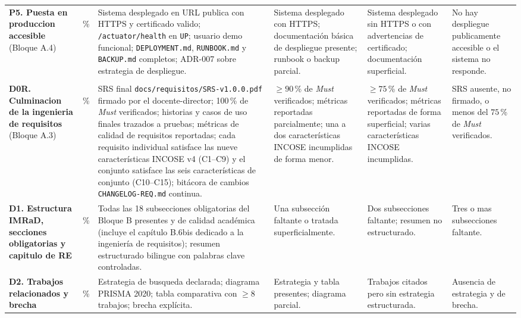 \documentclass[11pt,a4paper]{article}
\begin{document}
{\begin{longtable}{|L{2.9cm}|C{0.9cm}|L{2.5cm}|L{2.5cm}|L{2.5cm}|L{2.3cm}|}
\textbf{P5. Puesta en produccion accesible} (Bloque A.4) &
\,\% &
Sistema desplegado en URL publica con HTTPS y certificado valido; \texttt{/actuator/health} en \texttt{UP}; usuario demo funcional; \texttt{DEPLOYMENT.md}, \texttt{RUNBOOK.md} y \texttt{BACKUP.md} completos; ADR-007 sobre estrategia de despliegue. &
Sistema desplegado con HTTPS; documentaci\'{o}n b\'{a}sica de despliegue presente; runbook o backup parcial. &
Sistema desplegado sin HTTPS o con advertencias de certificado; documentaci\'{o}n superficial. &
No hay despliegue publicamente accesible o el sistema no responde. \\

\\ \hline

\textbf{D0R. Culminacion de la ingenieria de requisitos} (Bloque A.3) &
\,\% &
SRS final \texttt{docs/requisitos/SRS-v1.0.0.pdf} firmado por el docente-director; 100\,\% de \emph{Must} verificados; historias y casos de uso finales trazados a pruebas; m\'{e}tricas de calidad de requisitos reportadas; cada requisito individual satisface las nueve caracter\'{i}sticas INCOSE v4 (C1--C9) y el conjunto satisface las seis caracter\'{i}sticas de conjunto (C10--C15); bit\'{a}cora de cambios \texttt{CHANGELOG-REQ.md} continua. &
$\geq 90$\,\% de \emph{Must} verificados; m\'{e}tricas reportadas parcialmente; una a dos caracter\'{i}sticas INCOSE incumplidas de forma menor. &
$\geq 75$\,\% de \emph{Must} verificados; m\'{e}tricas reportadas de forma superficial; varias caracter\'{i}sticas INCOSE incumplidas. &
SRS ausente, no firmado, o menos del $75$\,\% de \emph{Must} verificados. \\

\textbf{D1. Estructura IMRaD, secciones obligatorias y capitulo de RE} &
\,\% &
Todas las 18 subsecciones obligatorias del Bloque B presentes y de calidad acad\'{e}mica (incluye el cap\'{i}tulo B.6bis dedicado a la ingenier\'{i}a de requisitos); resumen estructurado bilingue con palabras clave controladas. &
Una subsecci\'{o}n faltante o tratada superficialmente. &
Dos subsecciones faltante; resumen no estructurado. &
Tres o mas subsecciones faltante. \\

\textbf{D2. Trabajos relacionados y brecha} &
\,\% &
Estrategia de busqueda declarada; diagrama PRISMA 2020; tabla comparativa con $\geq 8$ trabajos; brecha expl\'{i}cita. &
Estrategia y tabla presentes; diagrama parcial. &
Trabajos citados pero sin estrategia estructurada. &
Ausencia de estrategia y de brecha. \\


\end{longtable}}
\end{document}
